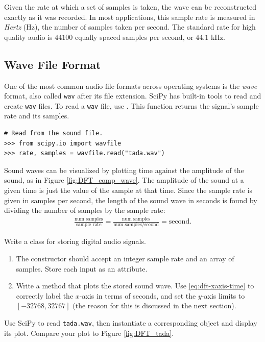 Given the rate at which a set of samples is taken, the wave can be reconstructed exactly as it was recorded.
In most applications, this sample rate is measured in \emph{Hertz} (Hz), the number of samples taken per second.
The standard rate for high quality audio is $44100$ equally spaced samples per second, or $44.1$ kHz.

\subsection*{Wave File Format} %

One of the most common audio file formats across operating systems is the \emph{wave} format, also called \texttt{wav} after its file extension.
SciPy has built-in tools to read and create \texttt{wav} files.
To read a \texttt{wav} file, use .
This function returns the signal's sample rate and its samples.

\begin{lstlisting}
# Read from the sound file.
>>> from scipy.io import wavfile
>>> rate, samples = wavfile.read("tada.wav")
\end{lstlisting}

Sound waves can be visualized by plotting time against the amplitude of the sound, as in Figure \ref{fig:DFT_comp_wave}.
The amplitude of the sound at a given time is just the value of the sample at that time.
Since the sample rate is given in samples per second, the length of the sound wave in seconds is found by dividing the number of samples by the sample rate:
\begin{align}
\label{eq:dft-xaxis-time}
\frac{\mbox{num samples}}{\mbox{sample rate}}
= \frac{\mbox{num samples}}{\mbox{num samples/second}}
= \mbox{second.}
\end{align}

\begin{problem} %
Write a  class for storing digital audio signals.
\begin{enumerate}
\item The constructor should accept an integer sample rate and an array of samples.
Store each input as an attribute.
\item Write a method that plots the stored sound wave.
Use \eqref{eq:dft-xaxis-time} to correctly label the $x$-axis in terms of seconds, and set the $y$-axis limits to $[-32768,32767]$ (the reason for this is discussed in the next section).
\end{enumerate}
Use SciPy to read \texttt{tada.wav}, then instantiate a corresponding  object and display its plot.
Compare your plot to Figure \ref{fig:DFT_tada}.
\label{prob:fft-SoundWave-init}
\end{problem}

